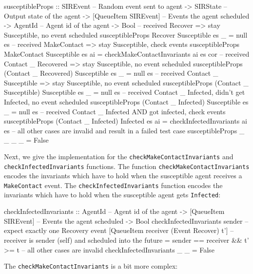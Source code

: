 \begin{HaskellCode}
susceptibleProps :: SIREvent              -- Random event sent to agent
                 -> SIRState              -- Output state of the agent
                 -> [QueueItem SIREvent]  -- Events the agent scheduled
                 -> AgentId               -- Agent id of the agent
                 -> Bool
-- received Recover => stay Susceptible, no event scheduled
susceptibleProps Recover Susceptible es _ = null es
-- received MakeContact => stay Susceptible, check events
susceptibleProps MakeContact Susceptible es ai
  = checkMakeContactInvariants ai es cor 
-- received Contact _ Recovered => stay Susceptible, no event scheduled
susceptibleProps (Contact _ Recovered) Susceptible es _ = null es
-- received Contact _ Susceptible => stay Susceptible, no event scheduled
susceptibleProps (Contact _ Susceptible) Susceptible es _  = null es
-- received Contact _ Infected, didn't get Infected, no event scheduled
susceptibleProps (Contact _ Infected) Susceptible es _ = null es
-- received Contact _ Infected AND got infected, check events
susceptibleProps (Contact _ Infected) Infected es ai
  = checkInfectedInvariants ai es
-- all other cases are invalid and result in a failed test case
susceptibleProps _ _ _ _ = False
\end{HaskellCode}

Next, we give the implementation for the \texttt{checkMakeContactInvariants} and \texttt{checkInfectedInvariants} functions. The function \texttt{checkMakeContactInvariants} encodes the invariants which have to hold when the susceptible agent receives a \texttt{MakeContact} event. The \texttt{checkInfectedInvariants} function encodes the invariants which have to hold when the susceptible agent gets \texttt{Infected}:

\begin{HaskellCode}
checkInfectedInvariants :: AgentId              -- Agent id of the agent 
                        -> [QueueItem SIREvent] -- Events the agent scheduled
                        -> Bool
checkInfectedInvariants sender 
  -- expect exactly one Recovery event
  [QueueItem receiver (Event Recover) t'] 
  -- receiver is sender (self) and scheduled into the future
  = sender == receiver && t' >= t 
-- all other cases are invalid
checkInfectedInvariants _ _ = False
\end{HaskellCode}

The \texttt{checkMakeContactInvariants} is a bit more complex:

